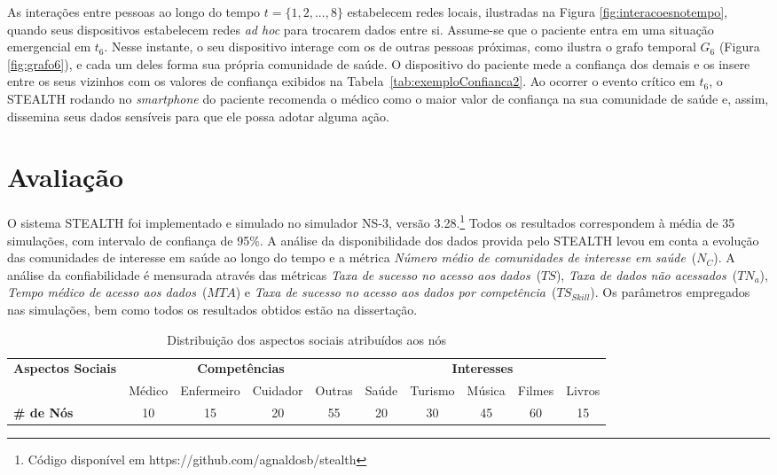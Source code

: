 \documentclass[12pt]{article}
\begin{document}
As interações entre pessoas ao longo do tempo $t = \{1,2,...,8\}$
estabelecem redes locais, ilustradas na Figura \ref{fig:interacoesnotempo}, quando seus dispositivos estabelecem redes \textit{ad hoc} para trocarem dados entre si. Assume-se que o paciente entra em uma situação emergencial em $t_6$. Nesse instante, o seu dispositivo interage com os de outras pessoas próximas, como ilustra o grafo temporal $G_6$ (Figura \ref{fig:grafo6}), e cada um deles forma sua própria comunidade de saúde. O dispositivo do paciente mede a confiança dos demais e os insere entre os seus vizinhos com os valores de confiança exibidos na  Tabela~\ref{tab:exemploConfianca2}. Ao ocorrer o evento crítico em $t_6$, o \mbox{STEALTH} rodando no \textit{smartphone} do paciente recomenda o médico como o maior valor de confiança na sua comunidade de saúde e, assim, dissemina seus dados sensíveis para que ele possa adotar alguma ação.

\section{Avaliação} \label{sec:aval}

O sistema \mbox{STEALTH} foi implementado e simulado no simulador NS-3, versão 3.28.\footnote{Código disponível em https://github.com/agnaldosb/stealth} Todos os resultados correspondem à média de 35 simulações, com intervalo de confiança de 95\%. A análise da disponibilidade dos dados provida pelo \mbox{STEALTH} levou em conta a evolução das comunidades de interesse em saúde ao longo do tempo e a métrica \textit{Número médio de comunidades de interesse em saúde}~($N_{C}$). A análise da confiabilidade é mensurada através das métricas \textit{Taxa de sucesso no acesso aos dados}~($TS$), \textit{Taxa de dados não acessados}~($TN_a$), \textit{Tempo médico de acesso aos dados}~($MTA$) e \textit{Taxa de sucesso no acesso aos dados por competência}~($TS_{Skill}$). Os parâmetros empregados nas simulações, bem como todos os resultados obtidos estão na dissertação.

\begin{table}[H]
\setlength{\extrarowheight}{2.0pt}
\centering
\caption{Distribuição dos aspectos sociais atribuídos aos nós}
\vspace{-0.2cm}
\label{tab:aspectosAtribuidos}
\begin{tabular}{|l|cccc|ccccc|}
\hline%
\multirow{2}{*}{\textbf{Aspectos Sociais}} & \multicolumn{4}{c|}{\textbf{Competências}} & \multicolumn{5}{c|}{\textbf{Interesses}} \\ \cline{2-10}
&Médico&Enfermeiro&Cuidador&Outras&Saúde&Turismo&Música&Filmes&Livros \\ \hline
\textbf{\# de Nós} &10&15&20&55&20&30&45&60&15 \\ 
\hline%
\end{tabular}
\end{table}
\end{document}
